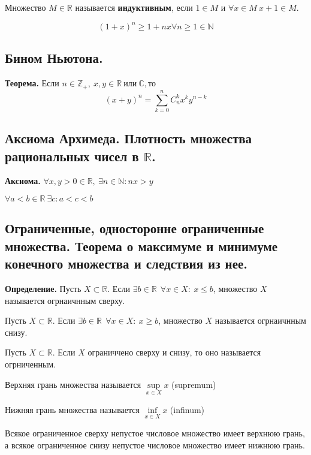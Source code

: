 \documentclass{article}
\begin{document}
 Множество $M \in \mathbb{R} $ называется {\bf индуктивным}, если $1 \in M$ и $\forall x \in M \ x + 1 \in M$.


\begin{equation*}
	(1 + x)^n \geq 1 + nx \forall n \geq 1 \in \mathbb{N}
\end{equation*} 

\subsection{Бином Ньютона.}
{\bf Теорема.} Если $n \in \mathbb{Z}_+,\ x,y \in \mathbb{R} \ \text{или} \ \mathbb{C}, \text{то}$ 
\begin{equation*}
	(x + y)^n = \displaystyle\sum\limits_{k = 0}^{n}C_n^kx^ky^{n-k}
\end{equation*}

\subsection{Аксиома Архимеда. Плотность множества рациональных чисел в $\mathbb{R}$.}
{\bf Аксиома.} $\forall x,y > 0 \in \mathbb{R},\ \exists n \in \mathbb{N} : nx > y$

 $\forall a<b \in \mathbb{R} \ \exists c: a<c<b$

\subsection{Ограниченные, односторонне ограниченные множества. Теорема о максимуме и минимуме конечного множества и следствия из нее.}
{\bf Определение.} Пусть $X \subset \mathbb{R}$. Если $\exists b \in \mathbb{R}\ \ \forall x \in X:\ x \leq b$, множество $X$ называется огрнаичнным сверху. 

 Пусть $X \subset \mathbb{R}$. Если $\exists b \in \mathbb{R}\ \ \forall x \in X:\ x \geq b$, множество $X$ называется огрнаичнным снизу. 

 Пусть $X \subset \mathbb{R}$. Если $X$ ограниччено сверху и снизу, то оно называется огрниченным.

 Верхняя грань множества называется $\sup\limits_{x \in X}x$ (supremum)

 Нижняя грань множества называется $\inf\limits_{x \in X}x$ (infinum)

 Всякое ограниченное сверху непустое числовое множество имеет верхнюю грань, а всякое ограниченное снизу непустое числовое множество имеет нижнюю грань.
\end{document}
